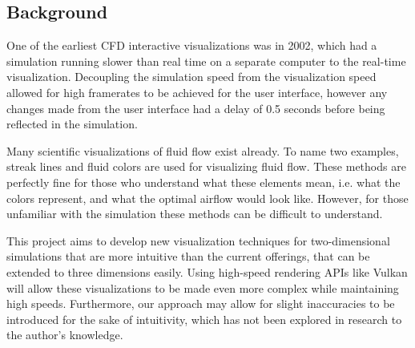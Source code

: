 \subsection{Background}
One of the earliest CFD interactive visualizations was in 2002, which had a simulation running slower than real time on a separate computer to the real-time visualization\cite{paper:2002vis:10.5555/509740.509745}.
Decoupling the simulation speed from the visualization speed allowed for high framerates to be achieved for the user interface, however any changes made from the user interface had a delay of 0.5 seconds before being reflected in the simulation.

Many scientific visualizations of fluid flow exist already.
To name two examples, streak lines and fluid colors are used for visualizing fluid flow\cite{video:AutodeskFlowDesign}.
These methods are perfectly fine for those who understand what these elements mean, i.e. what the colors represent, and what the optimal airflow would look like.
However, for those unfamiliar with the simulation these methods can be difficult to understand.

This project aims to develop new visualization techniques for two-dimensional simulations that are more intuitive than the current offerings, that can be extended to three dimensions easily.
Using high-speed rendering APIs like Vulkan\cite{tool:Vulkan} will allow these visualizations to be made even more complex while maintaining high speeds.
Furthermore, our approach may allow for slight inaccuracies to be introduced for the sake of intuitivity, which has not been explored in research to the author's knowledge.


